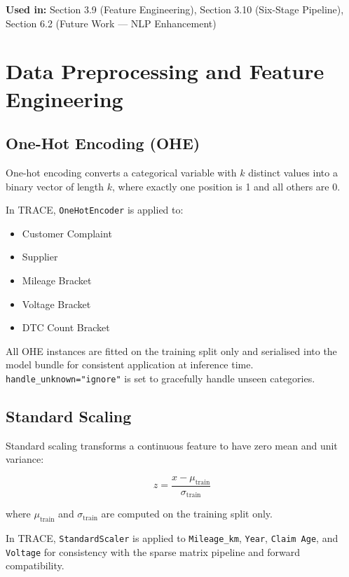 \documentclass[10pt]{article}
\begin{document}
\textbf{Used in:} Section 3.9 (Feature Engineering), Section 3.10 (Six-Stage Pipeline), Section 6.2 (Future Work --- NLP Enhancement)

\section{Data Preprocessing and Feature Engineering}

\subsection{One-Hot Encoding (OHE)}

One-hot encoding converts a categorical variable with \(k\) distinct values into a binary vector of length \(k\), where exactly one position is 1 and all others are 0.

In TRACE, \texttt{OneHotEncoder} is applied to:
\begin{itemize}
    \item Customer Complaint
    \item Supplier
    \item Mileage Bracket
    \item Voltage Bracket
    \item DTC Count Bracket
\end{itemize}

All OHE instances are fitted on the training split only and serialised into the model bundle for consistent application at inference time. \texttt{handle\_unknown="ignore"} is set to gracefully handle unseen categories.

\subsection{Standard Scaling}

Standard scaling transforms a continuous feature to have zero mean and unit variance:

\begin{equation}
z = \frac{x - \mu_{\text{train}}}{\sigma_{\text{train}}}
\end{equation}

where \(\mu_{\text{train}}\) and \(\sigma_{\text{train}}\) are computed on the training split only.

In TRACE, \texttt{StandardScaler} is applied to \texttt{Mileage\_km}, \texttt{Year}, \texttt{Claim Age}, and \texttt{Voltage} for consistency with the sparse matrix pipeline and forward compatibility.
\end{document}
